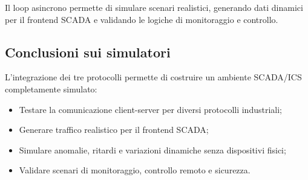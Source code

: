 Il loop asincrono permette di simulare scenari realistici, generando dati dinamici per il frontend SCADA e validando le logiche di monitoraggio e controllo.

\subsection{Conclusioni sui simulatori}

L’integrazione dei tre protocolli permette di costruire un ambiente SCADA/ICS completamente simulato:

\begin{itemize}
    \item Testare la comunicazione client-server per diversi protocolli industriali;
    \item Generare traffico realistico per il frontend SCADA;
    \item Simulare anomalie, ritardi e variazioni dinamiche senza dispositivi fisici;
    \item Validare scenari di monitoraggio, controllo remoto e sicurezza.
\end{itemize}
